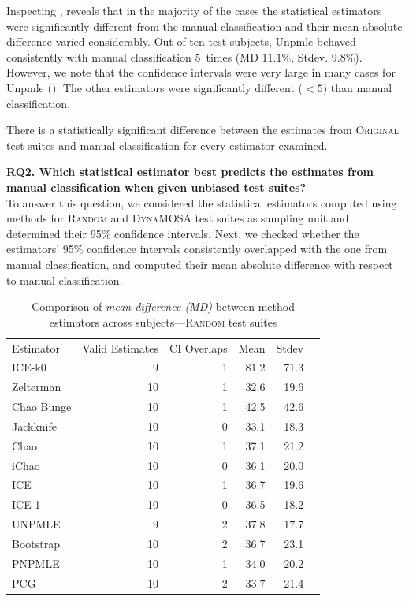 \documentclass[sigconf,review,anonymous]{acmart}
\newcommand{\ICEallrare}{ICE-k0\xspace}
\newcommand{\Zelterman}{Zelterman\xspace}
\newcommand{\ChaoBunge}{Chao Bunge\xspace}
\newcommand{\Jackknife}{Jackknife\xspace}
\newcommand{\Chao}{Chao\xspace}
\newcommand{\improvedChao}{iChao\xspace}
\newcommand{\ICE}{ICE\xspace}
\newcommand{\improvedICE}{ICE-1\xspace}
\newcommand{\Unpmle}{UNPMLE\xspace}
\newcommand{\Bootstrap}{Bootstrap\xspace}
\newcommand{\Pnpmle}{PNPMLE\xspace}
\newcommand{\PCG}{PCG\xspace}
\newcommand{\original}{\textsc{Original}\xspace}
\newcommand{\EvosuiteRandom}{\textsc{Random}\xspace}
\newcommand{\EvosuiteDynamosa}{\textsc{DynaMOSA}\xspace}
\begin{document}
Inspecting , reveals that in the majority of the cases the
statistical estimators were significantly different from the manual classification
and their mean absolute difference varied considerably.
Out of ten test subjects, Unpmle behaved consistently with manual classification
5~times (MD $11.1$\%, Stdev. 9.8\%). However, we note that the confidence
intervals were very large in many cases for Unpmle ().
%
The other estimators were significantly different ($<5$) than manual classification.

\begin{tcolorbox}[boxrule=0.5pt, arc=4pt, boxsep=0pt, width=\columnwidth]
There is a statistically significant difference between the estimates
from \original test suites and manual classification for
every estimator examined.
\end{tcolorbox}

\noindent\textbf{RQ2. Which statistical estimator best predicts the estimates
from manual classification when given unbiased test suites?}\\
%
To answer this question, we considered the statistical estimators computed
using methods for \EvosuiteRandom and \EvosuiteDynamosa test suites as sampling unit
and determined their 95\% confidence intervals.
%
Next, we checked whether the estimators' 95\% confidence intervals consistently
overlapped with the one from manual classification, and computed their mean absolute
difference with respect to manual classification.
\begin{table}
\caption{Comparison of \emph{mean difference (MD)} between method
estimators across subjects---\EvosuiteRandom test suites}
\begin{tabular}{|l|r|r|r|r|r|}
Estimator	&Valid Estimates	&CI Overlaps	&Mean	&Stdev	\\
\ICEallrare	&	9	&	1	&81.2	&	71.3\\
\Zelterman	&	10	&	1	&32.6	&	19.6\\
\ChaoBunge	&	10	&	1	&42.5	&	42.6\\
\Jackknife	&	10	&	0	&33.1	&	18.3\\
\Chao	&	10	&	1	&37.1	&	21.2\\
\improvedChao	&	10	&	0	&36.1	&	20.0\\
\ICE	&	10	&	1	&36.7	&	19.6\\
\improvedICE	&	10	&	0	&36.5	&	18.2\\
\Unpmle	&	9	&	2	&37.8	&	17.7\\
\Bootstrap	&	10	&	2	&36.7	&	23.1\\
\Pnpmle	&	10	&	1	&34.0	&	20.2\\
\PCG	&	10	&	2	&33.7	&	21.4\\
\end{tabular}
\label{tbl:estrandom}
\end{table}
\end{document}
